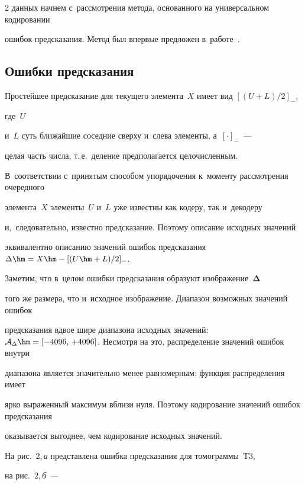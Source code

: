 \begin{multicols}{2}
данных начнем с~рассмотрения метода, основанного на универсальном кодировании 

ошибок предсказания. Метод был впервые предложен в~работе~\cite{b01}.



\vspace*{-6pt}



\subsection{Ошибки предсказания}



Простейшее предсказание для текущего элемента~$X$ имеет вид $[(U\!+\!L)/2]_{-}$, 

где~$U$

и~$L$ суть ближайшие соседние сверху и~слева элементы, а~$[\cdot]_{-}$~--- 

целая часть числа, т.\,е.\ деление предполагается целочис\-лен\-ным. 

В~соответствии с~принятым способом упорядочения к~моменту рассмотрения очередного 

элемента~$X$ элементы~$U$ и~$L$ уже известны как кодеру, так и~декодеру 

и,~следовательно, известно предсказание. Поэтому описание исходных значений 

эквивалентно описанию значений ошибок предсказания $\Delta\hm=X\hm-[(U\hm+L)/2]_{-}$. 

Заметим, что в~целом ошибки предсказания образуют изображение~$\boldsymbol{\Delta}$ 

того же размера, что и~исходное изображение. Диапазон возможных значений ошибок 

предсказания вдвое шире диапазона исходных значений: ${\cal A}_{\Delta}\hm=

[-4096,\,+4096]$. Несмотря на это, распределение значений ошибок внутри 

диапазона является значительно менее равномерным: функция распределения имеет 

ярко выраженный максимум вблизи нуля. Поэтому кодирование значений ошибок предсказания 

оказывается выгоднее, чем кодирование исходных значений.



На рис.~2,\,\textit{а} представлена ошибка предсказания для томограммы~T3, 

на рис.~2,\,\textit{б}~--- 


\end{multicols}
